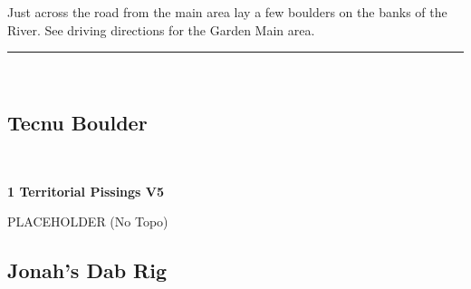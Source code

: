 \begin{multicols}{2}
\begin{minipage}{\columnwidth}
Just across the road from the main area lay a few boulders on the banks of the River. See driving directions for the Garden Main area.
\end{minipage}

\end{multicols}
\rule{\textwidth}{1pt}
\begin{multicols}{2}
	\begin{minipage}{\columnwidth}
	\
	\end{minipage}
			\subsection*{Tecnu Boulder}\label{bf:Tecnu Boulder}
			\begin{minipage}{\columnwidth}
			\
			\end{minipage}
			
					\begin{minipage}{\linewidth}	
					\label{rt:Territorial Pissings}\colorbox{RoyalBlue!20}{\textbf{1 Territorial Pissings V5  }}
					\begin{adjustwidth}{0.5cm}{}				
					PLACEHOLDER
						\newline (No Topo) 
					\end{adjustwidth}
					\end{minipage}
			\subsection*{Jonah's Dab Rig}\label{bf:Jonah's Dab Rig}
			\begin{minipage}{\columnwidth}
			\
			\end{minipage}
			

\end{multicols}
